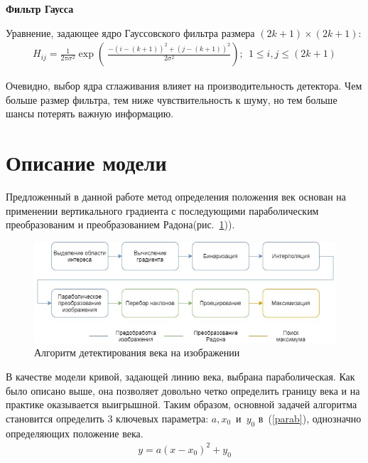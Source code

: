 \documentclass[12pt,a4paper]{article} %
\begin{document}
\textbf{Фильтр Гаусса}

Уравнение, задающее ядро Гауссовского фильтра размера $(2k+1)\times (2k+1)$:
\begin{gather}\label{norm}
	H_{ij}=\frac{1}{2\pi \sigma^2}\exp{\left(\ \frac {-(i-(k+1))^2+(j-(k+1))^2}{2\sigma^2}\right)};~~1\leq i, j \leq(2k+1)
\end{gather}

Очевидно, выбор ядра сглаживания влияет на производительность детектора. Чем больше размер фильтра, тем ниже чувствительность к шуму, но тем больше шансы потерять важную информацию.

\newpage




\newpage
\section{Описание модели}

 Предложенный в данной работе метод определения положения век основан на применении вертикального градиента с последующими параболическим преобразованим и преобразованием Радона(рис.~\ref{fig:map})).

\begin{figure}[h]
	
	\centering
	
	\includegraphics[width=0.8\linewidth]{map.jpg}
	
	\caption{Алгоритм детектирования века на изображении}
	
	\label{fig:map}
	
\end{figure}

В качестве модели кривой, задающей линию века, выбрана параболическая. Как было описано выше, она позволяет довольно четко определить границу века и на практике оказывается выигрышной. Таким образом, основной задачей алгоритма становится определить 3 ключевых параметра: $a, x_0$~и~$y_0$ в~(\ref{parab}), однозначно определяющих положение века.
\begin{gather}\label{parab}
	y = a(x-x_0)^2 + y_0
\end{gather}
\end{document}

